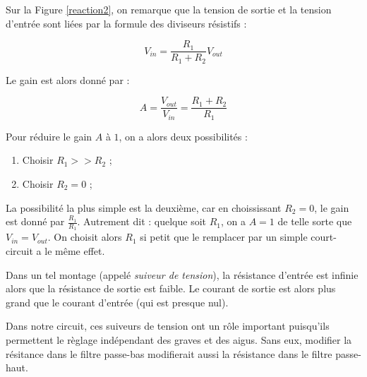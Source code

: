 Sur la Figure \ref{reaction2}, on remarque que la tension de sortie et la tension d'entrée sont liées 
par la formule des diviseurs résistifs :

$$V_{in} = \frac{R_1}{R_1 + R_2} V_{out}$$

Le gain est alors donné par :

$$A = \frac{V_{out}}{V_{in}} = \frac{R_1 + R_2}{R_1}$$

Pour réduire le gain $A$ à $1$, on a alors deux possibilités :

\begin{enumerate}
	\item	Choisir $R_1 >> R_2$ ;
	\item Choisir $R_2 = 0$ ;
\end{enumerate}

La possibilité la plus simple est la deuxième, car en choississant $R_2 = 0$, le gain est donné par $\frac{R_1}{R_1}$. 
Autrement dit : quelque soit $R_1$, on a $A = 1$ de telle sorte que $V_{in} = V_{out}$. On choisit alors $R_1$ si petit 
que le remplacer par un simple court-circuit a le même effet.

Dans un tel montage (appelé \textit{suiveur de tension}), la résistance d'entrée est infinie alors que la résistance de 
sortie est faible. Le courant de sortie est alors plus grand que le courant d'entrée (qui est presque nul).

Dans notre circuit, ces suiveurs de tension ont un rôle important puisqu'ils permettent le règlage indépendant des
graves et des aigus. Sans eux, modifier la résitance dans le filtre passe-bas modifierait aussi la résistance dans
le filtre passe-haut.


